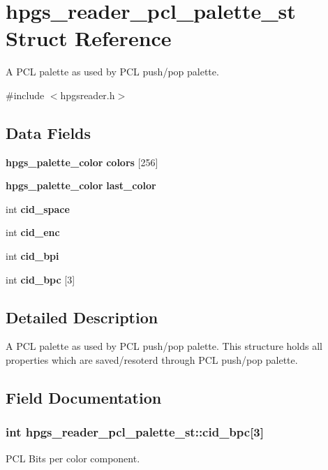 \section{hpgs\_\-reader\_\-pcl\_\-palette\_\-st Struct Reference}
\label{structhpgs__reader__pcl__palette__st}


A PCL palette as used by PCL push/pop palette.  




{\ttfamily \#include $<$hpgsreader.h$>$}

\subsection*{Data Fields}
\begin{DoxyCompactItemize}
\item 
{\bf hpgs\_\-palette\_\-color} {\bf colors} [256]
\item 
{\bf hpgs\_\-palette\_\-color} {\bf last\_\-color}
\item 
int {\bf cid\_\-space}
\item 
int {\bf cid\_\-enc}
\item 
int {\bf cid\_\-bpi}
\item 
int {\bf cid\_\-bpc} [3]
\end{DoxyCompactItemize}


\subsection{Detailed Description}
A PCL palette as used by PCL push/pop palette. This structure holds all properties which are saved/resoterd through PCL push/pop palette. 

\subsection{Field Documentation}
\subsubsection[{cid\_\-bpc}]{\setlength{\rightskip}{0pt plus 5cm}int {\bf hpgs\_\-reader\_\-pcl\_\-palette\_\-st::cid\_\-bpc}[3]}\label{structhpgs__reader__pcl__palette__st_a7fcff7f264204990c01632d0a603d6e2}
PCL Bits per color component. 
